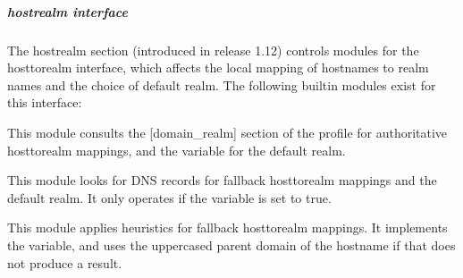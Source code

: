 \documentclass[letterpaper,10pt,english]{sphinxmanual}
\begin{document}
\subparagraph{hostrealm interface}
\label{\detokenize{admin/conf_files/krb5_conf:hostrealm-interface}}\label{\detokenize{admin/conf_files/krb5_conf:hostrealm}}
\sphinxAtStartPar
The hostrealm section (introduced in release 1.12) controls modules
for the host\sphinxhyphen{}to\sphinxhyphen{}realm interface, which affects the local mapping of
hostnames to realm names and the choice of default realm.  The following
built\sphinxhyphen{}in modules exist for this interface:
\begin{description}
\sphinxAtStartPar
This module consults the {[}domain\_realm{]} section of the profile for
authoritative host\sphinxhyphen{}to\sphinxhyphen{}realm mappings, and the 
variable for the default realm.

\sphinxAtStartPar
This module looks for DNS records for fallback host\sphinxhyphen{}to\sphinxhyphen{}realm
mappings and the default realm.  It only operates if the
 variable is set to true.

\sphinxAtStartPar
This module applies heuristics for fallback host\sphinxhyphen{}to\sphinxhyphen{}realm
mappings.  It implements the  variable, and
uses the uppercased parent domain of the hostname if that does not
produce a result.

\end{description}
\end{document}

